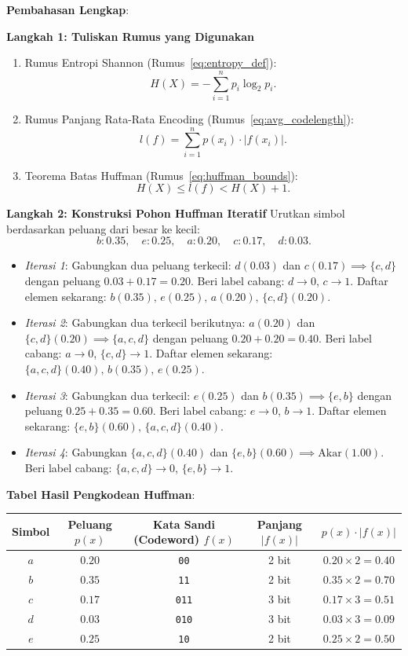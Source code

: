 \documentclass[11pt,a4paper]{article}
\begin{document}
\noindent\textbf{Pembahasan Lengkap}:

\noindent\textbf{Langkah 1: Tuliskan Rumus yang Digunakan}
\begin{enumerate}
    \item Rumus Entropi Shannon (Rumus~\eqref{eq:entropy_def}):
    \[
    H(X) = - \sum_{i=1}^n p_i \log_2 p_i.
    \]
    \item Rumus Panjang Rata-Rata Encoding (Rumus~\eqref{eq:avg_codelength}):
    \[
    l(f) = \sum_{i=1}^n p(x_i) \cdot |f(x_i)|.
    \]
    \item Teorema Batas Huffman (Rumus~\eqref{eq:huffman_bounds}):
    \[
    H(X) \le l(f) < H(X) + 1.
    \]
\end{enumerate}

\noindent\textbf{Langkah 2: Konstruksi Pohon Huffman Iteratif}
Urutkan simbol berdasarkan peluang dari besar ke kecil:
\[
b: 0.35, \quad e: 0.25, \quad a: 0.20, \quad c: 0.17, \quad d: 0.03.
\]
\begin{itemize}
    \item \textit{Iterasi 1}: Gabungkan dua peluang terkecil: $d(0.03)$ dan $c(0.17) \implies \{c,d\}$ dengan peluang $0.03 + 0.17 = 0.20$.
    Beri label cabang: $d \to 0$, $c \to 1$.
    Daftar elemen sekarang: $b(0.35), \, e(0.25), \, a(0.20), \, \{c,d\}(0.20)$.
    \item \textit{Iterasi 2}: Gabungkan dua terkecil berikutnya: $a(0.20)$ dan $\{c,d\}(0.20) \implies \{a,c,d\}$ dengan peluang $0.20 + 0.20 = 0.40$.
    Beri label cabang: $a \to 0$, $\{c,d\} \to 1$.
    Daftar elemen sekarang: $\{a,c,d\}(0.40), \, b(0.35), \, e(0.25)$.
    \item \textit{Iterasi 3}: Gabungkan dua terkecil: $e(0.25)$ dan $b(0.35) \implies \{e,b\}$ dengan peluang $0.25 + 0.35 = 0.60$.
    Beri label cabang: $e \to 0$, $b \to 1$.
    Daftar elemen sekarang: $\{e,b\}(0.60), \, \{a,c,d\}(0.40)$.
    \item \textit{Iterasi 4}: Gabungkan $\{a,c,d\}(0.40)$ dan $\{e,b\}(0.60) \implies \text{Akar}(1.00)$.
    Beri label cabang: $\{a,c,d\} \to 0$, $\{e,b\} \to 1$.
\end{itemize}

\noindent\textbf{Tabel Hasil Pengkodean Huffman}:
\begin{center}
\begin{tabular}{ccccc}
\toprule
\textbf{Simbol} & \textbf{Peluang $p(x)$} & \textbf{Kata Sandi (Codeword) $f(x)$} & \textbf{Panjang $|f(x)|$} & $p(x) \cdot |f(x)|$ \\
\midrule
$a$ & $0.20$ & \texttt{00} & 2 bit & $0.20 \times 2 = 0.40$ \\
$b$ & $0.35$ & \texttt{11} & 2 bit & $0.35 \times 2 = 0.70$ \\
$c$ & $0.17$ & \texttt{011} & 3 bit & $0.17 \times 3 = 0.51$ \\
$d$ & $0.03$ & \texttt{010} & 3 bit & $0.03 \times 3 = 0.09$ \\
$e$ & $0.25$ & \texttt{10} & 2 bit & $0.25 \times 2 = 0.50$ \\
\bottomrule
\end{tabular}
\end{center}
\end{document}
